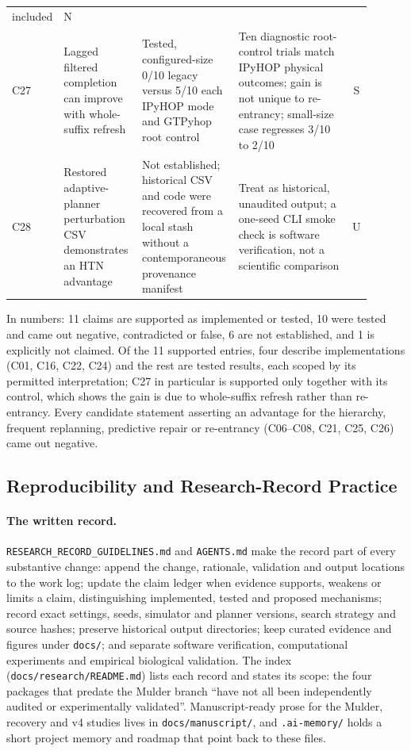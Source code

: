 {\begin{longtable}{@{}p{0.045\linewidth}p{0.22\linewidth}p{0.27\linewidth}p{0.36\linewidth}c@{}}
  included & N \\
C27 & Lagged filtered completion can improve with whole-suffix refresh & Tested, configured-size 0/10 legacy versus
  5/10 each IPyHOP mode and GTPyhop root control & Ten diagnostic root-control trials match IPyHOP physical
  outcomes; gain is not unique to re-entrancy; small-size case regresses 3/10 to 2/10 & S \\
C28 & Restored adaptive-planner perturbation CSV demonstrates an HTN advantage & Not established; historical CSV
  and code were recovered from a local stash without a contemporaneous provenance manifest & Treat as historical,
  unaudited output; a one-seed CLI smoke check is software verification, not a scientific comparison & U \\
\end{longtable}
}

In numbers: 11 claims are supported as implemented or tested, 10 were tested and came out negative,
contradicted or false, 6 are not established, and 1 is explicitly not claimed. Of the 11 supported entries,
four describe implementations (C01, C16, C22, C24) and the rest are tested results, each scoped by its
permitted interpretation; C27 in particular is supported only together with its control, which shows the gain
is due to whole-suffix refresh rather than re-entrancy. Every candidate statement asserting an advantage for the
hierarchy, frequent replanning, predictive repair or re-entrancy (C06--C08, C21, C25, C26) came out negative.

\subsection{Reproducibility and Research-Record Practice}
\label{sec:record-repro}

\paragraph{The written record.}
\texttt{RESEARCH\_\allowbreak{}RECORD\_\allowbreak{}GUIDELINES.md} and \texttt{AGENTS.md} make the record part of every substantive
change: append the change, rationale, validation and output locations to the work log; update the claim ledger
when evidence supports, weakens or limits a claim, distinguishing implemented, tested and proposed mechanisms;
record exact settings, seeds, simulator and planner versions, search strategy and source hashes; preserve
historical output directories; keep curated evidence and figures under \texttt{docs/}; and separate software
verification, computational experiments and empirical biological validation. The index
(\texttt{docs/\allowbreak{}research/\allowbreak{}README.md}) lists each record and states its scope: the four packages that predate the
Mulder branch ``have not all been independently audited or experimentally validated''. Manuscript-ready prose
for the Mulder, recovery and v4 studies lives in \texttt{docs/\allowbreak{}manuscript/\allowbreak{}}, and \texttt{.ai-memory/} holds a
short project memory and roadmap that point back to these files.

